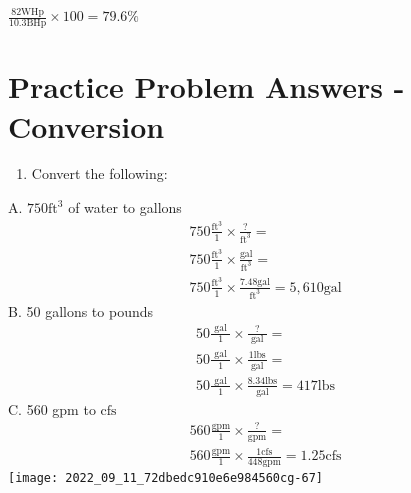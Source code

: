 $\frac{82 \mathrm{WHp}}{10.3 \mathrm{BHp}} \times 100=79.6 \%$

\section{Practice Problem Answers - Conversion}
\begin{enumerate}
  \item Convert the following:
\end{enumerate}
A. $750 \mathrm{ft}^{3}$ of water to gallons
$$
\begin{aligned}
&750 \frac{\mathrm{ft}^{3}}{1} \times \frac{?}{\mathrm{ft}^{3}}= \\
&750 \frac{\mathrm{ft}^{3}}{1} \times \frac{\mathrm{gal}}{\mathrm{ft}^{3}}= \\
&750 \frac{\mathrm{ft}^{3}}{1} \times \frac{7.48 \mathrm{gal}}{\mathrm{ft}^{3}}=5,610 \mathrm{gal}
\end{aligned}
$$
B. 50 gallons to pounds
$$
\begin{aligned}
&50 \frac{\text { gal }}{1} \times \frac{?}{\text { gal }}= \\
&50 \frac{\text { gal }}{1} \times \frac{1 \mathrm{lbs}}{\text { gal }}= \\
&50 \frac{\text { gal }}{1} \times \frac{8.34 \mathrm{lbs}}{\text { gal }}=417 \mathrm{lbs}
\end{aligned}
$$
C. 560 gpm to $\mathrm{cfs}$
$$
\begin{aligned}
& 560 \frac{\mathrm{gpm}}{1} \times \frac{?}{\mathrm{gpm}}= \\
& 560 \frac{\mathrm{gpm}}{1} \times \frac{1 \mathrm{cfs}}{448 \mathrm{gpm}}=1.25 \mathrm{cfs}
\end{aligned}
$$
\texttt{[image: 2022\_09\_11\_72dbedc910e6e984560cg-67]}

